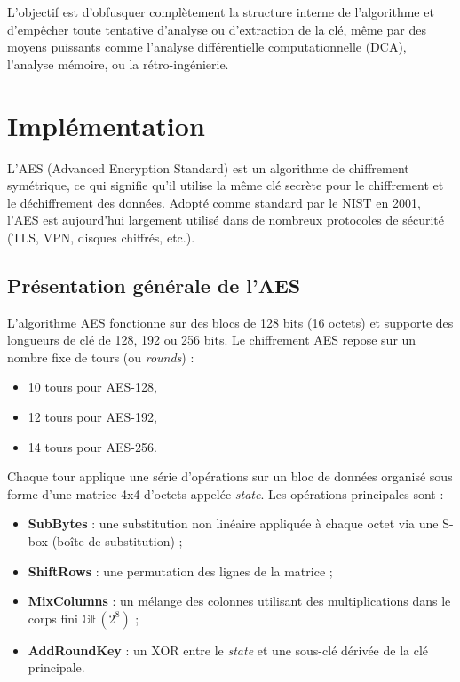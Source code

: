\documentclass[a4paper, 10pt]{article}
\begin{document}
L’objectif est d’obfusquer complètement la structure interne de l’algorithme et d’empêcher toute tentative d’analyse ou d’extraction de la clé, même par des moyens puissants comme l’analyse différentielle computationnelle (DCA), l’analyse mémoire, ou la rétro-ingénierie.


  \section{Implémentation}
  \label{sec:impl}
  \normalsize
L’AES (Advanced Encryption Standard) est un algorithme de chiffrement symétrique, ce qui signifie qu’il utilise la même clé secrète pour le chiffrement et le déchiffrement des données. Adopté comme standard par le NIST en 2001, l’AES est aujourd’hui largement utilisé dans de nombreux protocoles de sécurité (TLS, VPN, disques chiffrés, etc.).

\subsection{Présentation générale de l'AES}

L’algorithme AES fonctionne sur des blocs de 128 bits (16 octets) et supporte des longueurs de clé de 128, 192 ou 256 bits. Le chiffrement AES repose sur un nombre fixe de tours (ou \textit{rounds}) :

\begin{itemize}
  \item 10 tours pour AES-128,
  \item 12 tours pour AES-192,
  \item 14 tours pour AES-256.
\end{itemize}

Chaque tour applique une série d'opérations sur un bloc de données organisé sous forme d'une matrice 4x4 d'octets appelée \textit{state}. Les opérations principales sont :

\begin{itemize}
  \item \textbf{SubBytes} : une substitution non linéaire appliquée à chaque octet via une S-box (boîte de substitution) ;
  \item \textbf{ShiftRows} : une permutation des lignes de la matrice ;
  \item \textbf{MixColumns} : un mélange des colonnes utilisant des multiplications dans le corps fini $\mathbb{GF}(2^8)$ ;
  \item \textbf{AddRoundKey} : un XOR entre le \textit{state} et une sous-clé dérivée de la clé principale.
\end{itemize}
\end{document}
